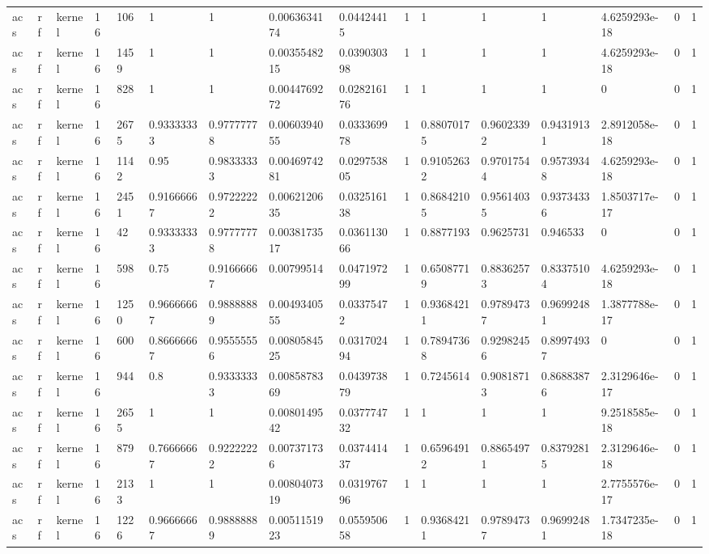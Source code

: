 \begin{tabular}{llllllllllllllll}
acs & rf & kernel & 16 & 106 & 1 & 1 & 0.0063634174 & 0.04424415 & 1 & 1 & 1 & 1 & 4.6259293e-18 & 0 & 1 \\
acs & rf & kernel & 16 & 1459 & 1 & 1 & 0.0035548215 & 0.039030398 & 1 & 1 & 1 & 1 & 4.6259293e-18 & 0 & 1 \\
acs & rf & kernel & 16 & 828 & 1 & 1 & 0.0044769272 & 0.028216176 & 1 & 1 & 1 & 1 & 0 & 0 & 1 \\
acs & rf & kernel & 16 & 2675 & 0.93333333 & 0.97777778 & 0.0060394055 & 0.033369978 & 1 & 0.88070175 & 0.96023392 & 0.94319131 & 2.8912058e-18 & 0 & 1 \\
acs & rf & kernel & 16 & 1142 & 0.95 & 0.98333333 & 0.0046974281 & 0.029753805 & 1 & 0.91052632 & 0.97017544 & 0.95739348 & 4.6259293e-18 & 0 & 1 \\
acs & rf & kernel & 16 & 2451 & 0.91666667 & 0.97222222 & 0.0062120635 & 0.032516138 & 1 & 0.86842105 & 0.95614035 & 0.93734336 & 1.8503717e-17 & 0 & 1 \\
acs & rf & kernel & 16 & 42 & 0.93333333 & 0.97777778 & 0.0038173517 & 0.036113066 & 1 & 0.8877193 & 0.9625731 & 0.946533 & 0 & 0 & 1 \\
acs & rf & kernel & 16 & 598 & 0.75 & 0.91666667 & 0.00799514 & 0.047197299 & 1 & 0.65087719 & 0.88362573 & 0.83375104 & 4.6259293e-18 & 0 & 1 \\
acs & rf & kernel & 16 & 1250 & 0.96666667 & 0.98888889 & 0.0049340555 & 0.03375472 & 1 & 0.93684211 & 0.97894737 & 0.96992481 & 1.3877788e-17 & 0 & 1 \\
acs & rf & kernel & 16 & 600 & 0.86666667 & 0.95555556 & 0.0080584525 & 0.031702494 & 1 & 0.78947368 & 0.92982456 & 0.89974937 & 0 & 0 & 1 \\
acs & rf & kernel & 16 & 944 & 0.8 & 0.93333333 & 0.0085878369 & 0.043973879 & 1 & 0.7245614 & 0.90818713 & 0.86883876 & 2.3129646e-17 & 0 & 1 \\
acs & rf & kernel & 16 & 2655 & 1 & 1 & 0.0080149542 & 0.037774732 & 1 & 1 & 1 & 1 & 9.2518585e-18 & 0 & 1 \\
acs & rf & kernel & 16 & 879 & 0.76666667 & 0.92222222 & 0.007371736 & 0.037441437 & 1 & 0.65964912 & 0.88654971 & 0.83792815 & 2.3129646e-18 & 0 & 1 \\
acs & rf & kernel & 16 & 2133 & 1 & 1 & 0.0080407319 & 0.031976796 & 1 & 1 & 1 & 1 & 2.7755576e-17 & 0 & 1 \\
acs & rf & kernel & 16 & 1226 & 0.96666667 & 0.98888889 & 0.0051151923 & 0.055950658 & 1 & 0.93684211 & 0.97894737 & 0.96992481 & 1.7347235e-18 & 0 & 1 \\

\end{tabular}
